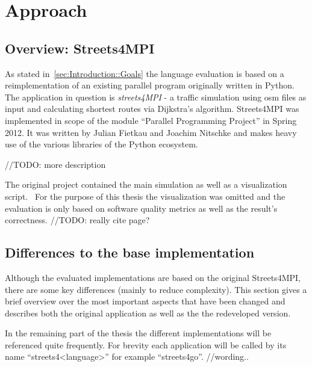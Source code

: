 \chapter{Approach}
\label{ch:Approach}


\section{Overview: Streets4MPI}
\label{sec:Approach::Overview}

As stated in~\autoref{sec:Introduction::Goals} the language evaluation is based on a reimplementation of an existing parallel program originally written in Python. The application in question is \textit{streets4MPI} - a traffic simulation using \gls{osm} files as input and calculating shortest routes via Dijkstra's algorithm. Streets4MPI was implemented in scope of the module ``Parallel Programming Project'' in Spring 2012. It was written by Julian Fietkau and Joachim Nitschke and makes heavy use of the various libraries of the Python ecosystem.

//TODO: more description

The original project contained the main simulation as well as a visualization script.~\cite[p.~3]{streets_report} For the purpose of this thesis the visualization was omitted and the evaluation is only based on software quality metrics as well as the result's correctness. //TODO: really cite page?

\section{Differences to the base implementation}
\label{sec:Approach::Differences}

Although the evaluated implementations are based on the original Streets4MPI, there are some key differences (mainly to reduce complexity). This section gives a brief overview over the most important aspects that have been changed and describes both the original application as well as the the redeveloped version.

In the remaining part of the thesis the different implementations will be referenced quite frequently. For brevity each application will be called by its name ``streets4<language>'' for example ``streets4go''. //wording..

